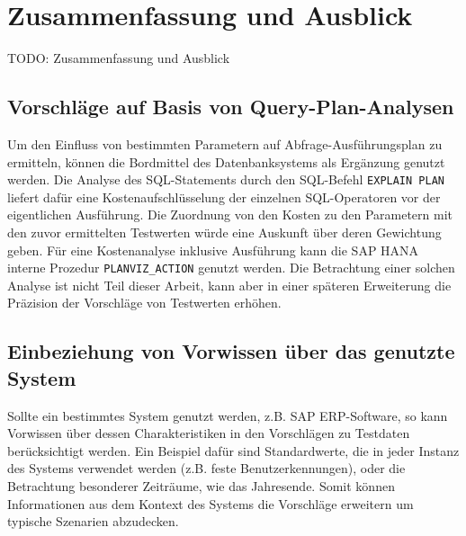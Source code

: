 \section{Zusammenfassung und Ausblick}\label{chap:conclusion}

%
%

TODO: Zusammenfassung und Ausblick


\subsection{Vorschläge auf Basis von Query-Plan-Analysen}
Um den Einfluss von bestimmten Parametern auf Abfrage-Ausführungsplan zu ermitteln, können die Bordmittel des Datenbanksystems als Ergänzung genutzt werden.
Die Analyse des SQL-Statements durch den SQL-Befehl \texttt{EXPLAIN PLAN} liefert dafür eine Kostenaufschlüsselung der einzelnen SQL-Operatoren vor der eigentlichen Ausführung.
Die Zuordnung von den Kosten zu den Parametern mit den zuvor ermittelten Testwerten würde eine Auskunft über deren Gewichtung geben.
Für eine Kostenanalyse inklusive Ausführung kann die SAP HANA interne Prozedur \texttt{PLANVIZ\_ACTION} genutzt werden.
Die Betrachtung einer solchen Analyse ist nicht Teil dieser Arbeit, kann aber in einer späteren Erweiterung die Präzision der Vorschläge von Testwerten erhöhen.

\subsection{Einbeziehung von Vorwissen über das genutzte System}
Sollte ein bestimmtes System genutzt werden, z.B. SAP ERP-Software, so kann Vorwissen über dessen Charakteristiken in den Vorschlägen zu Testdaten berücksichtigt werden.
Ein Beispiel dafür sind Standardwerte, die in jeder Instanz des Systems verwendet werden (z.B. feste Benutzerkennungen), oder die Betrachtung besonderer Zeiträume, wie das Jahresende.
Somit können Informationen aus dem Kontext des Systems die Vorschläge erweitern um typische Szenarien abzudecken.
